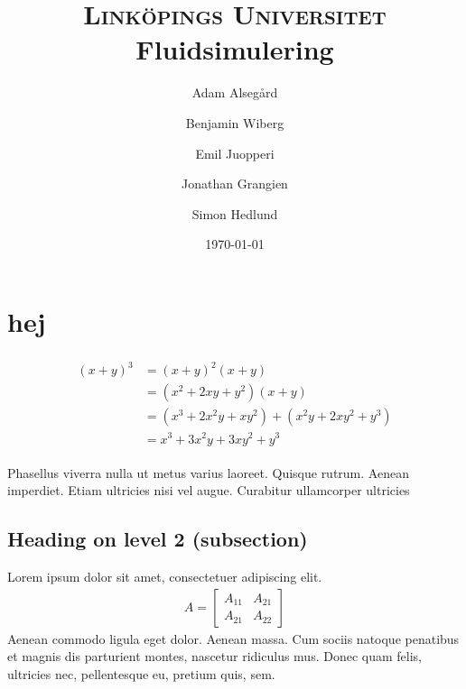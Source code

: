 \documentclass[paper=a4, fontsize=11pt]{report}
\title{
\normalfont \normalsize 
\textsc{Linköpings Universitet} \\ [25pt] %
\huge Fluidsimulering  \\ %
}
\author{Adam Alsegård \and Benjamin Wiberg \and Emil Juopperi \and Jonathan Grangien \and Simon Hedlund}
\date{\normalsize\today} %
\numberwithin{equation}{section} %
\numberwithin{figure}{section} %
\numberwithin{table}{section} %
\begin{document}
\maketitle %


\section{hej}

\lipsum[2] %

\begin{align} 
\begin{split}
(x+y)^3 	&= (x+y)^2(x+y)\\
&=(x^2+2xy+y^2)(x+y)\\
&=(x^3+2x^2y+xy^2) + (x^2y+2xy^2+y^3)\\
&=x^3+3x^2y+3xy^2+y^3
\end{split}					
\end{align}

Phasellus viverra nulla ut metus varius laoreet. Quisque rutrum. Aenean imperdiet. Etiam ultricies nisi vel augue. Curabitur ullamcorper ultricies


\subsection{Heading on level 2 (subsection)}

Lorem ipsum dolor sit amet, consectetuer adipiscing elit. 
\begin{align}
A = 
\begin{bmatrix}
A_{11} & A_{21} \\
A_{21} & A_{22}
\end{bmatrix}
\end{align}
Aenean commodo ligula eget dolor. Aenean massa. Cum sociis natoque penatibus et magnis dis parturient montes, nascetur ridiculus mus. Donec quam felis, ultricies nec, pellentesque eu, pretium quis, sem.
\end{document}
